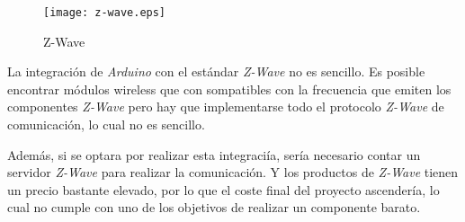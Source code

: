 \begin{figure}[H]
    \centering
    \texttt{[image: z-wave.eps]}
    \caption{Z-Wave}\label{fig:z-wave}
\end{figure}

La integración de \emph{Arduino} con el estándar \emph{Z-Wave} no es sencillo. Es posible encontrar módulos wireless que con sompatibles con la frecuencia que emiten los componentes \emph{Z-Wave} pero hay que implementarse todo el protocolo \emph{Z-Wave} de comunicación, lo cual no es sencillo.

Además, si se optara por realizar esta integraciía, sería necesario contar un servidor \emph{Z-Wave} para realizar la comunicación. Y los productos de \emph{Z-Wave} tienen un precio bastante elevado, por lo que el coste final del proyecto ascendería, lo cual no cumple con uno de los objetivos de realizar un componente barato.